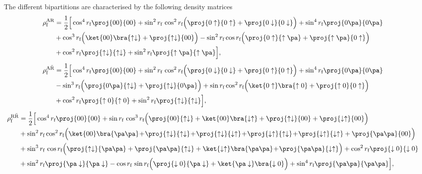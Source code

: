 The different bipartitions are characterised by the following density matrices
\begin{align}\label{rhoars2}
\nonumber \rho^\text{AR}_\text{f}&=\frac12\Big[\cos^4 r_\text{f} \proj{00}{00}+\sin^2 r_\text{f}\,\cos^2 r_\text{f}\Big(\proj{0\uparrow}{0\uparrow}+\proj{0\downarrow}{0\downarrow}\Big)+\sin^4 r_\text{f}\proj{0\pa}{0\pa}\\
&+\cos^3r_\text{f}\Big(\ket{00}\bra{\uparrow\downarrow}  +\proj{\uparrow\downarrow}{00}\Big)-\sin^2 r_\text{f}\cos r_\text{f}\Big(\proj{0\uparrow}{\uparrow\pa}+\proj{\uparrow\pa}{0\uparrow}\Big)\nonumber\\*
& +\cos^2 r_\text{f} \proj{\uparrow\downarrow}{\uparrow\downarrow}+\sin^2 r_\text{f}\proj{\uparrow\pa}{\uparrow\pa}\Big],
\end{align}
\begin{align}\label{rhoa-rs2}
\nonumber \rho^{\text{A}{\bar{\text{R}}}}_\text{f}&=\frac12\Big[\cos^4 r_\text{f} \proj{00}{00}+\sin^2 r_\text{f}\,\cos^2 r_\text{f}\Big(\proj{0\downarrow}{0\downarrow}+\proj{0\uparrow}{0\uparrow}\Big)+\sin^4 r_\text{f}\proj{0\pa}{0\pa} \nonumber\\*
& -\sin^3r_\text{f}\Big(\proj{0\pa}{\uparrow\downarrow}+\proj{\uparrow\downarrow}{0\pa}\Big)+\sin r_\text{f}\cos^2 r_\text{f}\Big(\ket{0\uparrow}\bra{\uparrow0}+\proj{\uparrow0}{0\uparrow}\Big)\nonumber\\*
&+\cos^2 r_\text{f} \proj{\uparrow0}{\uparrow0}+\sin^2 r_\text{f}\proj{\uparrow\downarrow}{\uparrow\downarrow}\Big],
\end{align}
\begin{align}\label{rhor-rs2}
\nonumber \rho^{\text{R}{\bar{\text{R}}}}_\text{f}&=\frac{1}{2}\Big[\cos^4 r_\text{f} \proj{00}{00}+\sin r_\text{f}\, \cos^3 r_\text{f}\Big(\proj{00}{\uparrow\downarrow}+\ket{00}\bra{\downarrow\uparrow}+\proj{\uparrow\downarrow}{00}+\proj{\downarrow\uparrow}{00}\Big)\\*
&\nonumber +\sin^2 r_\text{f}\cos^2 r_\text{f}\Big(\ket{00}\bra{\pa\pa}\!+\!\proj{\uparrow\downarrow}{\uparrow\downarrow}\!+\!\proj{\uparrow\downarrow}{\downarrow\uparrow}\!+\!\proj{\downarrow\uparrow}{\uparrow\downarrow}\!+\!\proj{\downarrow\uparrow}{\downarrow\uparrow}+\proj{\pa\pa}{00}\Big)\\*
&\nonumber + \sin^3 r_\text{f}\,\cos r_\text{f}\Big(\proj{\uparrow\downarrow}{\pa\pa}+\proj{\pa\pa}{\uparrow\downarrow}+\ket{\downarrow\uparrow}\bra{\pa\pa}\!+\!\proj{\pa\pa}{\downarrow\uparrow}\Big)+\cos^2 r_\text{f}\proj{\downarrow 0}{\downarrow 0}\\*
&\nonumber+\sin^2 r_\text{f}\proj{\pa\downarrow}{\pa\downarrow}-\cos r_\text{f}\,\sin r_\text{f}\Big(\proj{\downarrow0}{\pa\downarrow}+\ket{\pa\downarrow}\bra{\downarrow0}\Big)+\sin^4r_\text{f}\proj{\pa\pa}{\pa\pa}\Big],\\*
\end{align}
